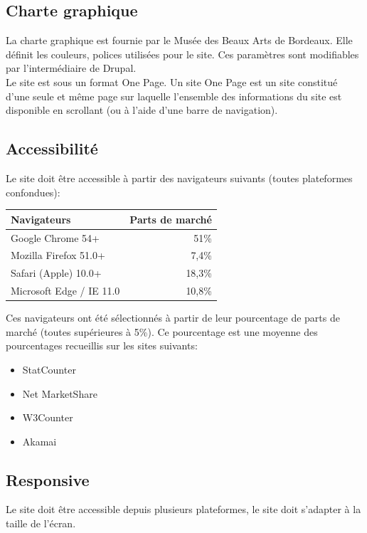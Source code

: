 \documentclass[11pt]{report}
\begin{document}
\subsection*{Charte graphique}

La charte graphique est fournie par le Musée des Beaux Arts de Bordeaux. Elle définit
les couleurs, polices utilisées pour le site. Ces paramètres sont modifiables par
l'intermédiaire de Drupal. \\
Le site est sous un format One Page. Un site One Page est un site constitué
d'une seule et même page sur laquelle l'ensemble des informations du site
est disponible en scrollant (ou à l'aide d'une barre de navigation).

\subsection*{Accessibilité}

Le site doit être accessible à partir des navigateurs suivants (toutes plateformes confondues):
\begin{center}
	\begin{tabular}{|l | r|}
		\hline
		Navigateurs & Parts de marché \\
		\hline
		\hline
		Google Chrome 54+ & 51\% \\
		\hline
		Mozilla Firefox 51.0+ & 7,4\% \\
		\hline
		Safari (Apple) 10.0+ & 18,3\% \\
		\hline
		Microsoft Edge / IE 11.0 & 10,8\% \\
		\hline
	\end{tabular}
\end{center}
Ces navigateurs ont été sélectionnés à partir de leur pourcentage de parts de
marché (toutes supérieures à 5\%). Ce pourcentage est une moyenne des pourcentages
recueillis sur les sites suivants:
\begin{itemize}
	\item StatCounter
	\item Net MarketShare
	\item W3Counter
	\item Akamai
\end{itemize}

\subsection*{Responsive}
Le site doit être accessible depuis plusieurs plateformes, le site doit s'adapter
à la taille de l'écran.
\end{document}
